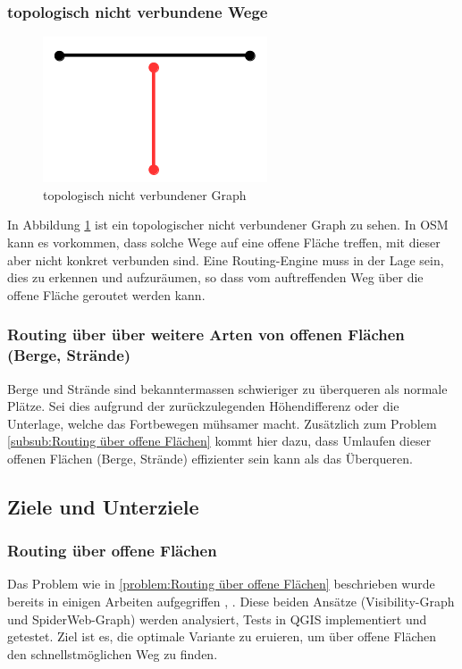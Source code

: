 \subsubsection{topologisch nicht verbundene Wege}
\label{problem:topologisch nicht verbundene Wege}

\begin{figure}[ht]
\centering
\includegraphics[width=0.5\linewidth]{technicalreport/img/topologisch_nicht_verbundener_graph}
\caption[topologisch nicht verbundener Graph]{topologisch nicht verbundener Graph}
\label{fig:topologisch_nicht_verbundener_graph}
\end{figure}

In Abbildung \ref{fig:topologisch_nicht_verbundener_graph} ist ein topologischer nicht verbundener Graph zu sehen. In \ac{OSM} kann es vorkommen, dass solche Wege auf eine offene Fläche treffen, mit dieser aber nicht konkret verbunden sind. Eine Routing-Engine muss in der Lage sein, dies zu erkennen und aufzuräumen, so dass vom auftreffenden Weg über die offene Fläche geroutet werden kann.

\subsubsection{Routing über über weitere Arten von offenen Flächen (Berge, Strände)}
\label{problem:Routing über über weitere Arten von offenen Flächen (Berge, Strände)}
Berge und Strände sind bekanntermassen schwieriger zu überqueren als normale Plätze. Sei dies aufgrund der zurückzulegenden Höhendifferenz oder die Unterlage, welche das Fortbewegen mühsamer macht. Zusätzlich zum Problem \ref{subsub:Routing über offene Flächen} kommt hier dazu, dass Umlaufen dieser offenen Flächen (Berge, Strände) effizienter sein kann als das Überqueren.  
	
\subsection{Ziele und Unterziele}
\label{Ziele und Unterziele}

\subsubsection{Routing über offene Flächen}
\label{target:Routing über offene Flächen}
Das Problem wie in \ref{problem:Routing über offene Flächen} beschrieben wurde bereits in einigen Arbeiten   aufgegriffen \cite{graser_visibility_graph}, \cite{dzafic_spider_web_graph}. Diese beiden Ansätze (Visibility-Graph und SpiderWeb-Graph) werden analysiert, Tests in QGIS implementiert und getestet. Ziel ist es, die optimale Variante zu eruieren, um über offene Flächen den schnellstmöglichen Weg zu finden.

